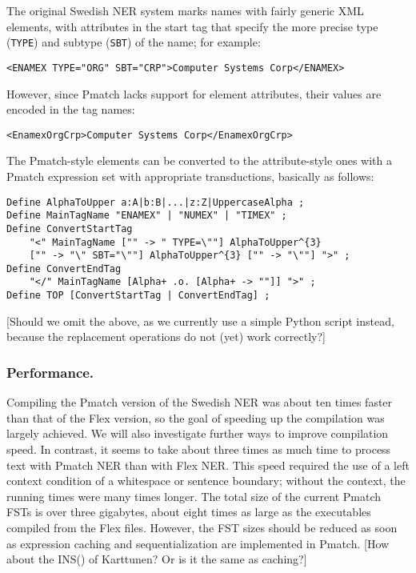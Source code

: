 \documentclass{llncs}
\begin{document}
The original Swedish NER system marks names with fairly generic XML
elements, with attributes in the start tag that specify the more
precise type (\texttt{TYPE}) and subtype (\texttt{SBT}) of the name;
for example:
\begin{verbatim}
<ENAMEX TYPE="ORG" SBT="CRP">Computer Systems Corp</ENAMEX>
\end{verbatim}
However, since Pmatch lacks support for element attributes, their
values are encoded in the tag names:
\begin{verbatim}
<EnamexOrgCrp>Computer Systems Corp</EnamexOrgCrp>
\end{verbatim}
The Pmatch-style elements can be converted to the attribute-style ones
with a Pmatch expression set with appropriate transductions, basically
as follows:

\begin{verbatim}
Define AlphaToUpper a:A|b:B|...|z:Z|UppercaseAlpha ;
Define MainTagName "ENAMEX" | "NUMEX" | "TIMEX" ;
Define ConvertStartTag
    "<" MainTagName ["" -> " TYPE=\""] AlphaToUpper^{3}
    ["" -> "\" SBT="\""] AlphaToUpper^{3} ["" -> "\""] ">" ;
Define ConvertEndTag
    "</" MainTagName [Alpha+ .o. [Alpha+ -> ""]] ">" ;
Define TOP [ConvertStartTag | ConvertEndTag] ;
\end{verbatim}

\textsf{[Should we omit the above, as we currently use a simple Python
  script instead, because the replacement operations do not (yet) work
  correctly?]}

\subsubsection{Performance.}

Compiling the Pmatch version of the Swedish NER was about ten times
faster than that of the Flex version, so the goal of speeding up the
compilation was largely achieved. We will also investigate further
ways to improve compilation speed. In contrast, it seems to take about
three times as much time to process text with Pmatch NER than with
Flex NER. This speed required the use of a left context condition
of a whitespace or sentence boundary; without the context, the running
times were many times longer. The total size of the current Pmatch
FSTs is over three gigabytes, about eight times as large as the
executables compiled from the Flex files. However, the FST sizes
should be reduced as soon as expression caching and sequentialization
are implemented in Pmatch. \textsf{[How about the INS() of Karttunen?
  Or is it the same as caching?]}
\end{document}
